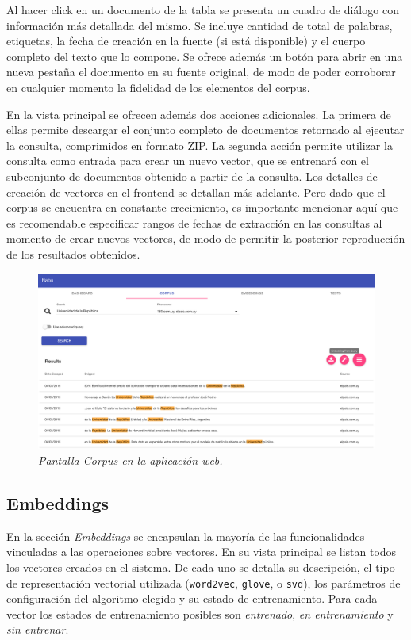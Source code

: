 Al hacer click en un documento de la tabla se presenta un cuadro de diálogo con información más detallada
del mismo. Se incluye cantidad de total de palabras, etiquetas, la fecha de creación en la fuente (si está
disponible) y el cuerpo completo del texto que lo compone. Se ofrece además un botón para abrir en una
nueva pestaña el documento en su fuente original, de modo de poder corroborar en cualquier momento la
fidelidad de los elementos del corpus.

En la vista principal se ofrecen además dos acciones adicionales. La primera de ellas permite descargar el
conjunto completo de documentos retornado al ejecutar la consulta, comprimidos en formato ZIP. La segunda
acción permite utilizar la consulta como entrada para crear un nuevo vector, que se entrenará con el
subconjunto de documentos obtenido a partir de la consulta. Los detalles de creación de vectores en el
frontend se detallan más adelante. Pero dado que el corpus se encuentra en constante crecimiento, es
importante mencionar aquí que es recomendable especificar rangos de fechas de extracción en las consultas
al momento de crear nuevos vectores, de modo de permitir la posterior reproducción de los resultados
obtenidos.

\begin{figure}[h]
    \centering
    \includegraphics[width=\textwidth]{images/ui-nabu-corpus}
    \caption{\textit{Pantalla Corpus en la aplicación web.}}
    \label{fig:ui-nabu-corpus}
\end{figure}

\subsection{Embeddings}

En la sección \textit{Embeddings} se encapsulan la mayoría de las funcionalidades vinculadas a las
operaciones sobre vectores. En su vista principal se listan todos los vectores creados en el sistema.
De cada uno se detalla su descripción, el tipo de representación vectorial utilizada (\texttt{word2vec},
\texttt{glove}, o \texttt{svd}), los parámetros de configuración del algoritmo elegido y su estado de
entrenamiento. Para cada vector los estados de entrenamiento posibles son \textit{entrenado},
\textit{en entrenamiento} y \textit{sin entrenar}.

